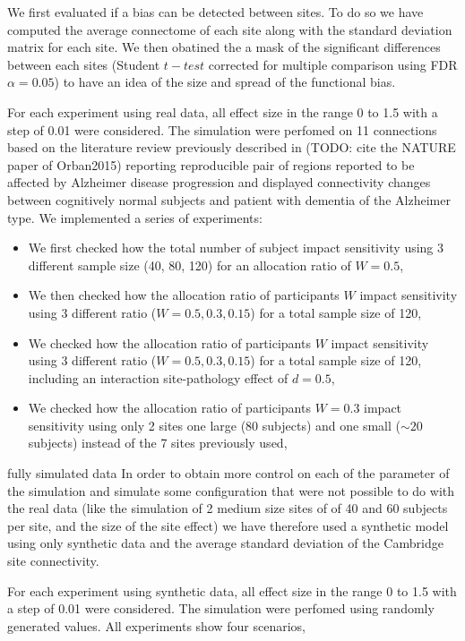 \documentclass[authoryear]{elsarticle}
\begin{document}
We first evaluated if a bias can be detected between sites. To do so we have computed the average connectome of each site along with the standard deviation matrix for each site. We then obatined the a mask of the significant differences between each sites (Student $t-test$ corrected for multiple comparison using FDR $\alpha=0.05$) to have an idea of the size and spread of the functional bias.

For each experiment using real data, all effect size in the range 0 to 1.5 with a step of 0.01 were considered. The simulation were perfomed on 11 connections based on the literature review previously described in (TODO: cite the NATURE paper of Orban2015) reporting reproducible pair of regions reported to be affected by Alzheimer disease progression and displayed connectivity changes between cognitively normal subjects and patient with dementia of the Alzheimer type. We implemented a series of experiments:

\begin{itemize}
  \item We first checked how the total number of subject impact sensitivity using 3 different sample size (40, 80, 120) for an allocation ratio of $W=0.5$,
  \item We then checked how the allocation ratio of participants $W$ impact sensitivity using 3 different ratio ($W=0.5,0.3,0.15$) for a total sample size of 120,
  \item We checked how the allocation ratio of participants $W$ impact sensitivity using 3 different ratio ($W=0.5,0.3,0.15$) for a total sample size of 120, including an interaction site-pathology effect of $d=0.5$,
  \item We checked how the allocation ratio of participants $W=0.3$ impact sensitivity using only 2 sites one large (80 subjects) and one small ($\sim20$ subjects) instead of the 7 sites previously used,
\end{itemize}

fully simulated data
In order to obtain more control on each of the parameter of the simulation and simulate some configuration that were not possible to do with the real data (like the simulation of 2 medium size sites of of 40 and 60 subjects per site, and the size of the site effect) we have therefore used a synthetic model using only synthetic data and the average standard deviation of the Cambridge site connectivity.

For each experiment using synthetic data, all effect size in the range 0 to 1.5 with a step of 0.01 were considered. The simulation were perfomed using randomly generated values. All experiments show four scenarios,  
\end{document}
